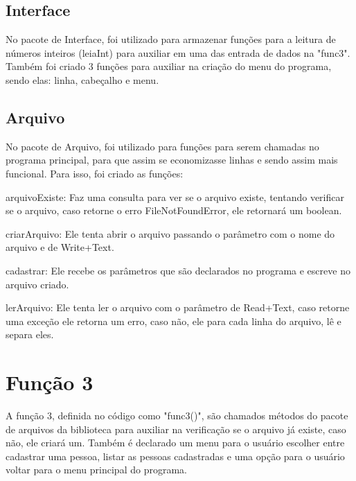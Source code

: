 \documentclass[12pt]{article}
\begin{document}
\subsection{Interface}
No pacote de Interface, foi utilizado para armazenar funções para a leitura de números inteiros (leiaInt) para auxiliar em uma das entrada de dados na "func3".
Também foi criado 3 funções para auxiliar na criação do menu do programa, sendo elas: linha, cabeçalho e menu.


\subsection{Arquivo}
No pacote de Arquivo, foi utilizado para funções para serem chamadas no programa principal, para que assim se economizasse linhas e sendo assim mais funcional.
Para isso, foi criado as funções:

\textbullet arquivoExiste: Faz uma consulta para ver se o arquivo existe, tentando verificar se o arquivo, caso retorne o erro FileNotFoundError, ele retornará um boolean.

\textbullet criarArquivo: Ele tenta abrir o arquivo passando o parâmetro com o nome do arquivo e de Write+Text.

\textbullet cadastrar: Ele recebe os parâmetros que são declarados no programa e escreve no arquivo criado.

\textbullet lerArquivo: Ele tenta ler o arquivo com o parâmetro de Read+Text, caso retorne uma exceção ele retorna um erro, caso não, ele para cada linha do arquivo, lê e separa eles.


\section{Função 3}
A função 3, definida no código como "func3()", são chamados métodos do pacote de arquivos da biblioteca para auxiliar na verificação se o arquivo já existe, caso não, ele criará um. Também é declarado um menu para o usuário escolher entre cadastrar uma pessoa, listar as pessoas cadastradas e uma opção para o usuário voltar para o menu principal do programa.

\end{document}
